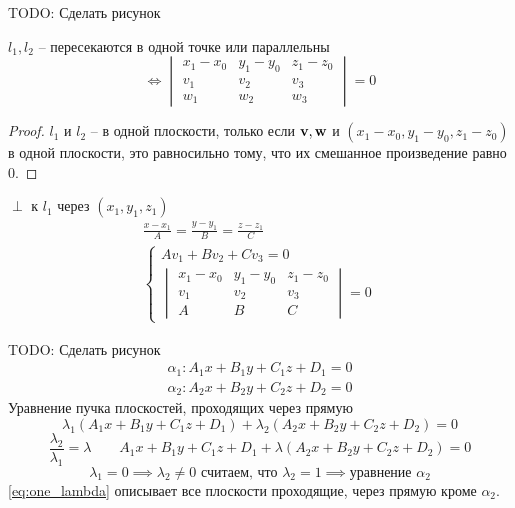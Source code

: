 \documentclass[main]{subfiles}
\begin{document}
\begin{theorem}
    TODO: Сделать рисунок

    $l_1, l_2$ -- пересекаются в одной точке или параллельны
    \[\Leftrightarrow
        \begin{vmatrix}
            x_1 - x_0 & y_1-y_0 & z_1-z_0 \\
            v_1       & v_2     & v_3     \\
            w_1       & w_2     & w_3
        \end{vmatrix} = 0\]
\end{theorem}
\begin{proof}
    $l_1$ и $l_2$ -- в одной плоскости, только если $\mathbf{v}, \mathbf{w}$ и
    $(x_1-x_0, y_1-y_0, z_1-z_0)$ в одной плоскости, это равносильно тому, что
    их смешанное произведение равно 0.
\end{proof}
\begin{example}
    $\perp$ к $l_1$ через $(x_1, y_1, z_1)$
    \begin{gather*}
        \frac{x-x_1}{A} = \frac{y-y_1}{B} = \frac{z-z_1}{C}\\
        \begin{cases}
            Av_1 + Bv_2 + Cv_3 = 0 \\
            \begin{vmatrix}
                x_1 - x_0 & y_1-y_0 & z_1-z_0 \\
                v_1       & v_2     & v_3     \\
                A         & B       & C
            \end{vmatrix} = 0
        \end{cases}
    \end{gather*}
\end{example}

\begin{definition}
    TODO: Сделать рисунок
    \begin{gather*}
        \alpha_1: A_1x + B_1y +C_1z + D_1 = 0\\
        \alpha_2: A_2x + B_2y +C_2z + D_2 = 0
    \end{gather*}
    Уравнение пучка плоскостей, проходящих через прямую
    \begin{equation}\label{eq:two_lambdas}
        \lambda_1 (A_1x + B_1y +C_1z + D_1) + \lambda_2 (A_2x + B_2y +C_2z + D_2) = 0
    \end{equation}
    \begin{equation}\label{eq:one_lambda}
        \frac{\lambda_2}{\lambda_1} = \lambda \qquad
        A_1x + B_1y +C_1z + D_1 + \lambda (A_2x + B_2y +C_2z + D_2) = 0
    \end{equation}
    \[\lambda_1 = 0 \implies \lambda_2 \neq 0 \text{ считаем, что } \lambda_2 = 1
        \implies \text{уравнение } \alpha_2 \]
    \eqref{eq:one_lambda} описывает все плоскости проходящие, через прямую кроме $\alpha_2$.
\end{definition}
\end{document}
